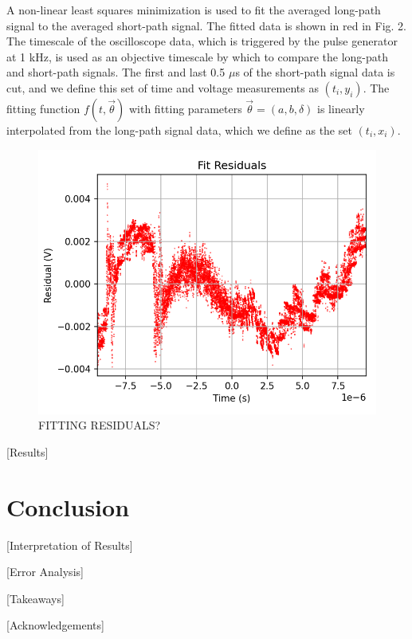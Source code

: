 \documentclass[%
 reprint,
 amsmath,amssymb,
 aps,
]{revtex4-2}
\begin{document}
 A non-linear least squares minimization is used to fit the averaged long-path signal to the averaged short-path signal. The fitted data is shown in red in Fig. 2. The timescale of the oscilloscope data, which is triggered by the pulse generator at 1 kHz, is used as an objective timescale by which to compare the long-path and short-path signals. The first and last 0.5 $\mu$s of the short-path signal data is cut, and we define this set of time and voltage measurements as $(t_i, y_i)$. The fitting function $f(t, \vec{\theta})$ with fitting parameters $\vec{\theta} = (a,b,\delta)$ is linearly interpolated from the long-path signal data, which we define as the set $(t_i, x_i)$. 

\begin{figure}[H]
\centering
\includegraphics[width=0.9\columnwidth]{Residuals.png}%
\caption{\label{fig:epsart} FITTING RESIDUALS?}
\end{figure}

[Results]







\section{Conclusion}

[Interpretation of Results]

[Error Analysis]

[Takeaways]

\begin{acknowledgments}

[Acknowledgements]

\end{acknowledgments}


\appendix


\end{document}
